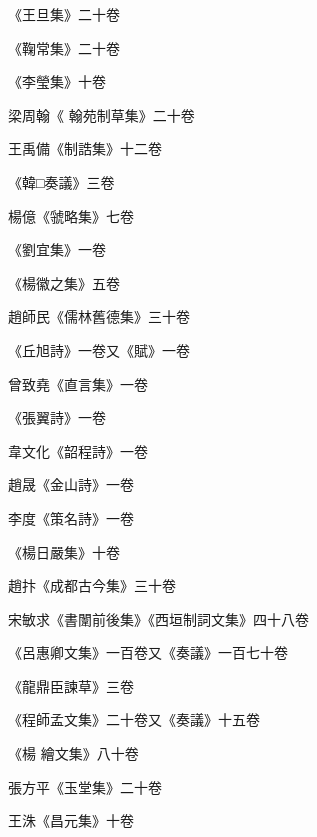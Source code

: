 \begin{pinyinscope}
 《王旦集》二十卷



 《鞠常集》二十卷



 《李瑩集》十卷



 梁周翰《
 翰苑制草集》二十卷



 王禹備《制誥集》十二卷



 《韓□奏議》三卷



 楊億《虢略集》七卷



 《劉宜集》一卷



 《楊徽之集》五卷



 趙師民《儒林舊德集》三十卷



 《丘旭詩》一卷又《賦》一卷



 曾致堯《直言集》一卷



 《張翼詩》一卷



 韋文化《韶程詩》一卷



 趙晟《金山詩》一卷



 李度《策名詩》一卷



 《楊日嚴集》十卷



 趙抃《成都古今集》三十卷



 宋敏求《書闈前後集》《西垣制詞文集》四十八卷



 《呂惠卿文集》一百卷又《奏議》一百七十卷



 《龍鼎臣諫草》三卷



 《程師孟文集》二十卷又《奏議》十五卷



 《楊
 繪文集》八十卷



 張方平《玉堂集》二十卷



 王洙《昌元集》十卷




\end{pinyinscope}
